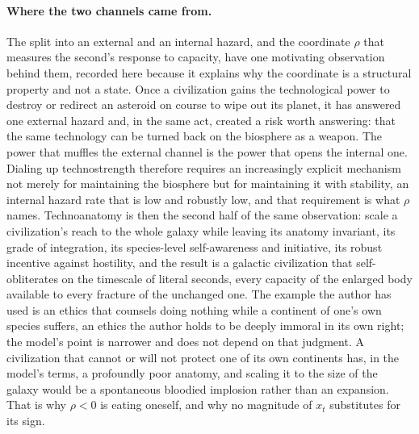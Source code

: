 \begin{definition}
\paragraph{Where the two channels came from.} The split into an external and an internal hazard, and the coordinate $\rho$ that measures the second's response to capacity, have one motivating observation behind them, recorded here because it explains why the coordinate is a structural property and not a state. Once a civilization gains the technological power to destroy or redirect an asteroid on course to wipe out its planet, it has answered one external hazard and, in the same act, created a risk worth answering: that the same technology can be turned back on the biosphere as a weapon. The power that muffles the external channel is the power that opens the internal one. Dialing up technostrength therefore requires an increasingly explicit mechanism not merely for maintaining the biosphere but for maintaining it with stability, an internal hazard rate that is low and robustly low, and that requirement is what $\rho$ names. Technoanatomy is then the second half of the same observation: scale a civilization's reach to the whole galaxy while leaving its anatomy invariant, its grade of integration, its species-level self-awareness and initiative, its robust incentive against hostility, and the result is a galactic civilization that self-obliterates on the timescale of literal seconds, every capacity of the enlarged body available to every fracture of the unchanged one. The example the author has used is an ethics that counsels doing nothing while a continent of one's own species suffers, an ethics the author holds to be deeply immoral in its own right; the model's point is narrower and does not depend on that judgment. A civilization that cannot or will not protect one of its own continents has, in the model's terms, a profoundly poor anatomy, and scaling it to the size of the galaxy would be a spontaneous bloodied implosion rather than an expansion. That is why $\rho < 0$ is eating oneself, and why no magnitude of $x_t$ substitutes for its sign.


\end{definition}
